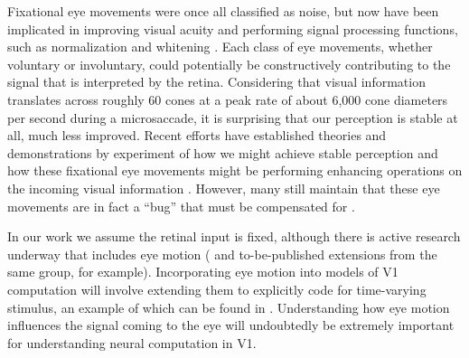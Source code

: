 Fixational eye movements were once all classified as noise, but now have been implicated in improving visual acuity \parencite{ratnam2017benefits, rucci2007miniature} and performing signal processing functions, such as normalization and whitening \parencite{aytekin2014visual}.
Each class of eye movements, whether voluntary or involuntary, could potentially be constructively contributing to the signal that is interpreted by the retina.
Considering that visual information translates across roughly 60 cones at a peak rate of about 6,000 cone diameters per second during a microsaccade, it is surprising that our perception is stable at all, much less improved.
Recent efforts have established theories and demonstrations by experiment of how we might achieve stable perception \parencite{arathorn2013unstable, bridgeman2010brain, murakami1998jitter, burak2010bayesian} and how these fixational eye movements might be performing enhancing operations on the incoming visual information \parencite{ahissar2012seeing, mostofi2016visual, kenyon2004correlated}.
However, many still maintain that these eye movements are in fact a ``bug'' that must be compensated for \parencite{packer1992blurring, kowler1979miniature, engbert2011integrated}.

In our work we assume the retinal input is fixed, although there is active research underway that includes eye motion (\cite{ratnam2017benefits} and to-be-published extensions from the same group, for example). Incorporating eye motion into models of V1 computation will involve extending them to explicitly code for time-varying stimulus, an example of which can be found in \parencite{olshausen2003learning}. Understanding how eye motion influences the signal coming to the eye will undoubtedly be extremely important for understanding neural computation in V1. 


